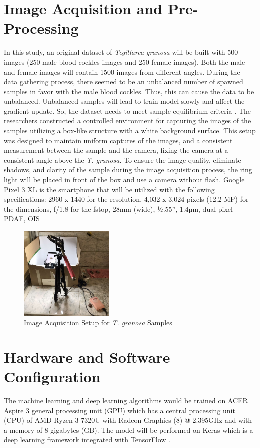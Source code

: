 \section{Image Acquisition and Pre-Processing}
\label{sec:imageprocess}
In this study, an original dataset of \textit{Tegillarca granosa} will be built with 500 images (250 male blood cockles images and 250 female images). Both the male and female \Tgranosa images will contain 1500 images from different angles. During the data gathering process, there seemed to be an unbalanced number of spawned samples in favor with the male blood cockles. Thus, this can cause the data to be unbalanced. Unbalanced samples will lead to train model slowly and affect the gradient update. So, the dataset needs to meet sample equilibrium criteria \cite{cui2020}. The researchers constructed a controlled environment for capturing the images of the samples utilizing a box-like structure with a white background surface. This setup was designed to maintain uniform captures of the images, and a consistent measurement between the sample and the camera, fixing the camera at a consistent angle above the \textit{T. granosa}. To ensure the image quality, eliminate shadows, and clarity of the sample during the image acquisition process, the ring light will be placed in front of the box and use a camera without flash. Google Pixel 3 XL is the smartphone that will be utilized with the following specifications: 2960 x 1440 for the resolution, 4,032 x 3,024 pixels (12.2 MP) for the dimensions, f/1.8 for the fstop, 28mm (wide), ½.55”, 1.4µm, dual pixel PDAF, OIS \cite{concepcion2023}

\begin{figure}[!htbp]
	\centering
	\includegraphics[width=0.4\textwidth]{figures/setup.jpg}
	\caption{Image Acquisition Setup for \textit{T. granosa} Samples}
	\label{fig: setup}
\end{figure}

\section{Hardware and Software Configuration}
The machine learning and deep learning algorithms would be trained on ACER Aspire 3 general processing unit (GPU) which has a central processing unit (CPU) of  AMD Ryzen 3 7320U with Radeon Graphics (8) @ 2.395GHz and with a memory of 8 gigabytes (GB). The model will be performed on Keras which is a deep learning framework integrated with TensorFlow \cite{cui2020}.

